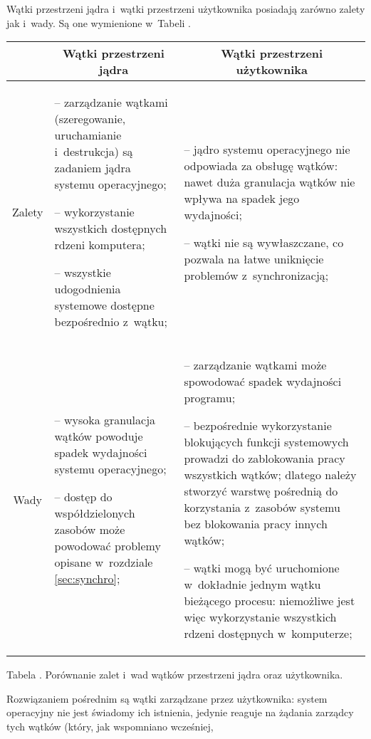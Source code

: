 \documentclass[12pt]{mwart}
\newcounter{tabmain}
\newcommand{\mytabcaption}[1]{ \begin{center}\parbox[t]{11.5cm}{\normalsize{Tabela \arabic{tabmain}. #1.}}\end{center} \addtocounter{tabmain}{1} }
\begin{document}
\par
%
\indent
{} \setcounter{userversuskernel}{\value{tabmain}}
	Wątki przestrzeni jądra i~wątki przestrzeni użytkownika posiadają zarówno zalety jak i~wady. Są one wymienione w~Tabeli .
  \begin{center}
  \begin{tabular}{|c|p{5cm}|p{5cm}|} \hline
                & \multicolumn{1}{c|}{Wątki przestrzeni jądra} & \multicolumn{1}{c|}{Wątki przestrzeni użytkownika} \\ \hline
      Zalety    & -- zarządzanie wątkami (szeregowanie, uruchamianie i~destrukcja) są zadaniem jądra systemu operacyjnego; \par 
                  -- wykorzystanie wszystkich dostępnych rdzeni komputera; \par 
                  -- wszystkie udogodnienia systemowe dostępne bezpośrednio z~wątku; 
                & -- jądro systemu operacyjnego nie odpowiada za obsługę wątków: nawet duża granulacja wątków nie wpływa na spadek jego wydajności; \par
                  -- wątki nie są wywłaszczane, co pozwala na łatwe uniknięcie problemów z~synchronizacją;
                \\ \hline
      Wady      & -- wysoka granulacja wątków powoduje spadek wydajności systemu operacyjnego; \par
                  -- dostęp do współdzielonych zasobów może powodować problemy opisane w~rozdziale \ref{sec:synchro};
                & -- zarządzanie wątkami może spowodować spadek wydajności programu; \par
                  -- bezpośrednie wykorzystanie blokujących funkcji systemowych prowadzi do zablokowania pracy wszystkich wątków; dlatego
                     należy stworzyć warstwę pośrednią do korzystania z~zasobów systemu bez blokowania pracy innych wątków; \par
                  -- wątki mogą być uruchomione w~dokładnie jednym wątku bieżącego procesu: niemożliwe jest więc wykorzystanie wszystkich rdzeni dostępnych w~komputerze;
                \\ \hline
  \end{tabular}
  \mytabcaption{Porównanie zalet i~wad wątków przestrzeni jądra oraz użytkownika}
  \end{center}
\par
\indent
  Rozwiązaniem pośrednim są wątki zarządzane przez użytkownika:
  system operacyjny nie jest świadomy ich istnienia, jedynie reaguje na żądania zarządcy tych wątków (który, jak wspomniano wcześniej,
\end{document}
